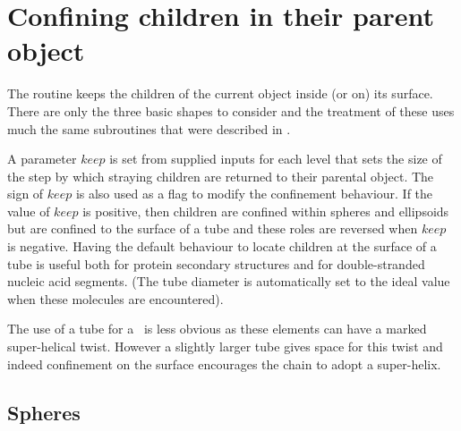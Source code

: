 \section{Confining children in their parent object}

The  routine keeps the children of the current object inside (or on) its
surface.  There are only the three basic shapes to consider and the treatment
of these uses much the same subroutines that were described in .

A parameter $keep$ is set from supplied inputs for each level that sets
the size of the step by which straying children are returned to their parental
object.   The sign of $keep$ is also used as a flag to modify the confinement
behaviour.  If the value of $keep$ 
is positive, then children are confined within spheres and ellipsoids but
are confined to the surface of a tube and these roles are reversed when
$keep$ is negative.   Having the default behaviour to locate children at the
surface of a tube is useful both for protein secondary structures and for
double-stranded nucleic acid segments.  (The tube diameter is automatically
set to the ideal value when these molecules are encountered).  

The use of a tube for a \Bs\ is less obvious as these elements can have a marked 
super-helical twist. However a slightly larger tube gives space for this twist
and indeed confinement on the surface encourages the chain to adopt a super-helix.   

\subsection{Spheres}


